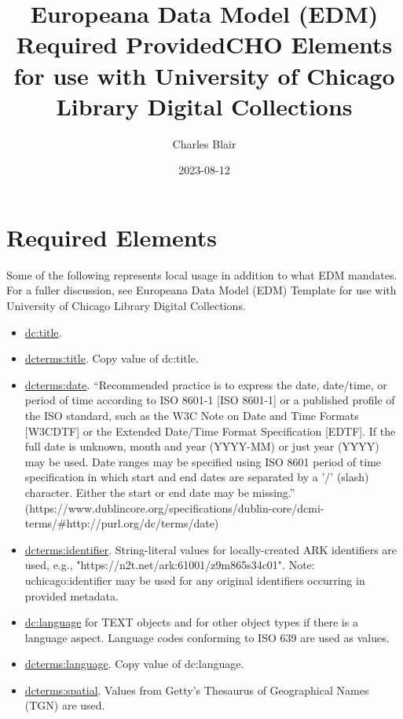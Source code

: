 \documentclass[11pt]{article}
\date{2023-08-12}
\title{Europeana Data Model (EDM) Required ProvidedCHO Elements for use with University of Chicago Library Digital Collections}
\author{Charles Blair}
\begin{document}
\maketitle

\section*{Required Elements}
Some of the following represents local usage in addition to what EDM mandates. For a fuller discussion, see Europeana Data Model (EDM) Template for use with University of Chicago Library Digital Collections.

\begin{itemize}

  \item \underline{dc:title}.

  \item \underline{dcterms:title}. Copy value of dc:title.

  \item \underline{dcterms:date}. ``Recommended practice is to express the date, date/time, or period of time according to ISO 8601-1 [ISO 8601-1] or a published profile of the ISO standard, such as the W3C Note on Date and Time Formats [W3CDTF] or the Extended Date/Time Format Specification [EDTF]. If the full date is unknown, month and year (YYYY-MM) or just year (YYYY) may be used. Date ranges may be specified using ISO 8601 period of time specification in which start and end dates are separated by a '/' (slash) character. Either the start or end date may be missing.'' (https://www.dublincore.org/specifications/dublin-core/dcmi-terms/\#http://purl.org/dc/terms/date)

  \item \underline{dcterms:identifier}. String-literal values for locally-created ARK identifiers are used, e.g., "https://n2t.net/ark:61001/z9m865s34c01". Note: uchicago:identifier may be used for any original identifiers occurring in provided metadata.

  \item \underline{dc:language} for TEXT objects and for other object types if there is a language aspect. Language codes conforming to ISO 639 are used as values.

  \item \underline{dcterms:language}. Copy value of dc:language.

  \item \underline{dcterms:spatial}. Values from Getty's Thesaurus of Geographical Names (TGN) are used.


\end{itemize}
\end{document}
